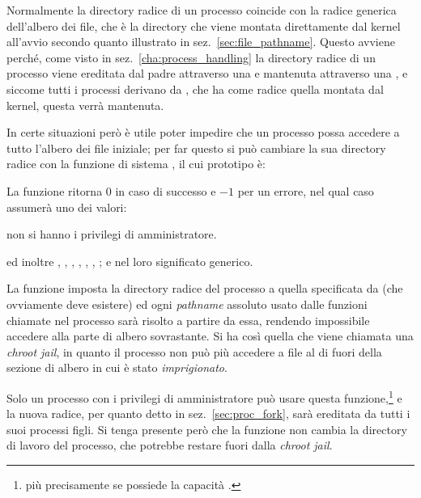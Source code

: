 Normalmente la directory radice di un processo coincide con la radice generica
dell'albero dei file, che è la directory che viene montata direttamente dal
kernel all'avvio secondo quanto illustrato in sez.~\ref{sec:file_pathname}.
Questo avviene perché, come visto in sez.~\ref{cha:process_handling} la
directory radice di un processo viene ereditata dal padre attraverso una
 e mantenuta attraverso una , e siccome tutti i processi
derivano da , che ha come radice quella montata dal kernel, questa
verrà mantenuta.

In certe situazioni però è utile poter impedire che un processo possa accedere
a tutto l'albero dei file iniziale; per far questo si può cambiare la sua
directory radice con la funzione di sistema , il cui prototipo
è:

\begin{funcproto}{
}

{La funzione ritorna $0$ in caso di successo e $-1$ per un errore, nel qual
  caso  assumerà uno dei valori: 
  \begin{errlist}
  \item[\errcode{EPERM}] non si hanno i privilegi di amministratore.
  \end{errlist}
  ed inoltre , , ,
  , , , ;
   e  nel loro significato generico.}
\end{funcproto}

La funzione imposta la directory radice del processo a quella specificata da
 (che ovviamente deve esistere) ed ogni \textit{pathname} assoluto
usato dalle funzioni chiamate nel processo sarà risolto a partire da essa,
rendendo impossibile accedere alla parte di albero sovrastante. Si ha così
quella che viene chiamata una \textit{chroot jail}, in quanto il processo non
può più accedere a file al di fuori della sezione di albero in cui è stato
\textsl{imprigionato}.

Solo un processo con i privilegi di amministratore può usare questa
funzione,\footnote{più precisamente se possiede la capacità
  .} e la nuova radice, per quanto detto in
sez.~\ref{sec:proc_fork}, sarà ereditata da tutti i suoi processi figli. Si
tenga presente però che la funzione non cambia la directory di lavoro del
processo, che potrebbe restare fuori dalla \textit{chroot jail}.

